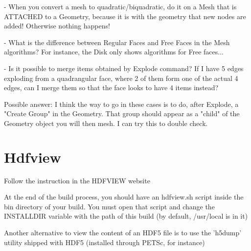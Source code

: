\documentclass[10pt]{book}
\begin{document}
- When you convert a mesh to quadratic/biquadratic, do it on a Mesh that is ATTACHED to a Geometry, because it is with the geometry that new nodes are added! 
  Otherwise nothing happens!

- What is the difference between Regular Faces and Free Faces in the Mesh algorithms? For instance, the Disk only shows algorithms for Free faces...

- Is it possible to merge items obtained by Explode command? If I have 5 edges exploding from a quadrangular face,
  where 2 of them form one of the actual 4 edges, can I merge them so that the face looks to have 4 items instead?
    
  Possible answer: I think the way to go in these cases is to do, after Explode, a "Create Group" in the Geometry.
    That group should appear as a "child" of the Geometry object you will then mesh. I can try this to double check.


 \part{Hdfview}


Follow the instruction in the HDFVIEW website

At the end of the build process, you should have an hdfview.sh script inside the bin directory of your build.
You must open that script and change the INSTALLDIR variable with the path of this build (by default, /usr/local is in it)

Another alternative to view the content of an HDF5 file is to use the 'h5dump' utility shipped with HDF5 (installed through PETSc, for instance)

   
    
    
\end{document}
